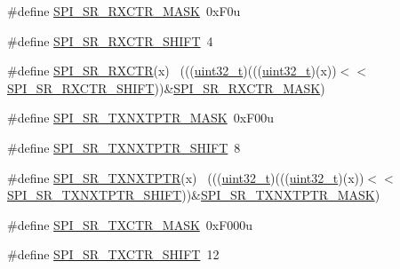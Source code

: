 \begin{DoxyCompactItemize}
\item 
\#define \hyperlink{group___s_p_i___register___masks_gad70ca8db9ba4e1d62e081ef648d84752}{S\+P\+I\+\_\+\+S\+R\+\_\+\+R\+X\+C\+T\+R\+\_\+\+M\+A\+SK}~0x\+F0u
\item 
\#define \hyperlink{group___s_p_i___register___masks_gacd499785f654eb1b4d1ced2bf0b2e7ac}{S\+P\+I\+\_\+\+S\+R\+\_\+\+R\+X\+C\+T\+R\+\_\+\+S\+H\+I\+FT}~4
\item 
\#define \hyperlink{group___s_p_i___register___masks_ga1635de4a9adc6d7b3a930239484d2fa9}{S\+P\+I\+\_\+\+S\+R\+\_\+\+R\+X\+C\+TR}(x)                                                ~(((\hyperlink{_p_e___types_8h_a33594304e786b158f3fb30289278f5af}{uint32\+\_\+t})(((\hyperlink{_p_e___types_8h_a33594304e786b158f3fb30289278f5af}{uint32\+\_\+t})(x))$<$$<$\hyperlink{group___s_p_i___register___masks_gacd499785f654eb1b4d1ced2bf0b2e7ac}{S\+P\+I\+\_\+\+S\+R\+\_\+\+R\+X\+C\+T\+R\+\_\+\+S\+H\+I\+FT}))\&\hyperlink{group___s_p_i___register___masks_gad70ca8db9ba4e1d62e081ef648d84752}{S\+P\+I\+\_\+\+S\+R\+\_\+\+R\+X\+C\+T\+R\+\_\+\+M\+A\+SK})
\item 
\#define \hyperlink{group___s_p_i___register___masks_ga5526eeae29bb85218c41d8a06608acbd}{S\+P\+I\+\_\+\+S\+R\+\_\+\+T\+X\+N\+X\+T\+P\+T\+R\+\_\+\+M\+A\+SK}~0x\+F00u
\item 
\#define \hyperlink{group___s_p_i___register___masks_ga129ad514464ae667c6d78ee9840236d5}{S\+P\+I\+\_\+\+S\+R\+\_\+\+T\+X\+N\+X\+T\+P\+T\+R\+\_\+\+S\+H\+I\+FT}~8
\item 
\#define \hyperlink{group___s_p_i___register___masks_gadbd95ad4fab6a131bb9f36c88f34e64b}{S\+P\+I\+\_\+\+S\+R\+\_\+\+T\+X\+N\+X\+T\+P\+TR}(x)                                          ~(((\hyperlink{_p_e___types_8h_a33594304e786b158f3fb30289278f5af}{uint32\+\_\+t})(((\hyperlink{_p_e___types_8h_a33594304e786b158f3fb30289278f5af}{uint32\+\_\+t})(x))$<$$<$\hyperlink{group___s_p_i___register___masks_ga129ad514464ae667c6d78ee9840236d5}{S\+P\+I\+\_\+\+S\+R\+\_\+\+T\+X\+N\+X\+T\+P\+T\+R\+\_\+\+S\+H\+I\+FT}))\&\hyperlink{group___s_p_i___register___masks_ga5526eeae29bb85218c41d8a06608acbd}{S\+P\+I\+\_\+\+S\+R\+\_\+\+T\+X\+N\+X\+T\+P\+T\+R\+\_\+\+M\+A\+SK})
\item 
\#define \hyperlink{group___s_p_i___register___masks_gaba58e43f829f6e6103933bf570e9feb7}{S\+P\+I\+\_\+\+S\+R\+\_\+\+T\+X\+C\+T\+R\+\_\+\+M\+A\+SK}~0x\+F000u
\item 
\#define \hyperlink{group___s_p_i___register___masks_gad7fc9ecdd51f12aabb492271648e133b}{S\+P\+I\+\_\+\+S\+R\+\_\+\+T\+X\+C\+T\+R\+\_\+\+S\+H\+I\+FT}~12

\end{DoxyCompactItemize}
